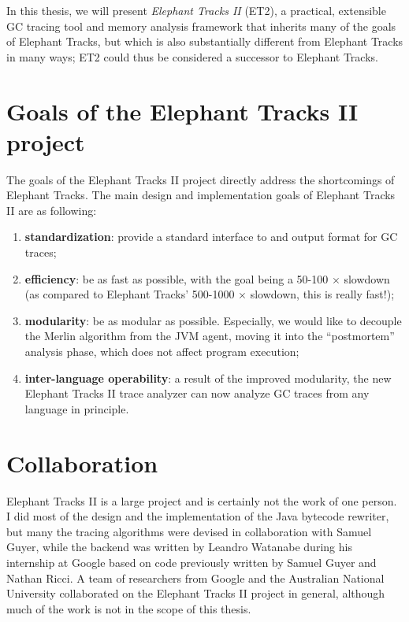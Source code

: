 In this thesis, we will present \emph{Elephant Tracks II} (ET2), a practical, extensible GC tracing tool and memory analysis framework that inherits many of
the goals of Elephant Tracks, but which is also substantially different from Elephant Tracks in many ways; ET2 could thus be considered
a successor to Elephant Tracks. 


\section{Goals of the Elephant Tracks II project}
The goals of the Elephant Tracks II project directly address the shortcomings of Elephant Tracks. The main design and implementation
goals of Elephant Tracks II are as following:

\begin{enumerate}
\item \textbf{standardization}: provide a standard interface to and output format for GC traces;
\item \textbf{efficiency}: be as fast as possible, with the goal being a 50-100 $\times$ slowdown (as compared to
  Elephant Tracks' 500-1000 $\times$ slowdown, this is really fast!);
\item \textbf{modularity}: be as modular as possible. Especially, we would like to decouple the Merlin algorithm from the
  JVM agent, moving it into the ``postmortem'' analysis phase, which does not affect program execution;
\item \textbf{inter-language operability}: a result of the improved modularity, the new Elephant Tracks II trace analyzer can
  now analyze GC traces from any language in principle.
\end{enumerate}

\section{Collaboration}
Elephant Tracks II is a large project and is certainly not the work of one person. I did most of the design and the implementation of the
Java bytecode rewriter, but many the tracing algorithms were devised in collaboration with Samuel Guyer, while the backend was
written by Leandro Watanabe during his internship at Google based on code previously written by Samuel Guyer and Nathan Ricci. A team
of researchers from Google and the Australian National University collaborated on the Elephant Tracks II project in general, although much of the
work is not in the scope of this thesis.

